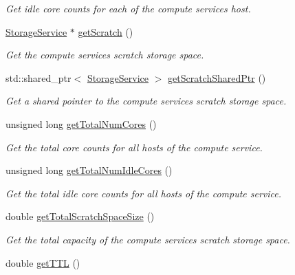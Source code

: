 \begin{DoxyCompactItemize}
\begin{DoxyCompactList}\small\item\em Get idle core counts for each of the compute service\textquotesingle{}s host. \end{DoxyCompactList}\item 
\hyperlink{classwrench_1_1_storage_service}{Storage\+Service} $\ast$ \hyperlink{classwrench_1_1_compute_service_a751da474fe424957a614116cef6a5e13}{get\+Scratch} ()
\begin{DoxyCompactList}\small\item\em Get the compute service\textquotesingle{}s scratch storage space. \end{DoxyCompactList}\item 
std\+::shared\+\_\+ptr$<$ \hyperlink{classwrench_1_1_storage_service}{Storage\+Service} $>$ \hyperlink{classwrench_1_1_compute_service_a6532846cd02094b6095341d37d5b2bf7}{get\+Scratch\+Shared\+Ptr} ()
\begin{DoxyCompactList}\small\item\em Get a shared pointer to the compute service\textquotesingle{}s scratch storage space. \end{DoxyCompactList}\item 
unsigned long \hyperlink{classwrench_1_1_compute_service_a5d2e4bca8b531521561f167769186f56}{get\+Total\+Num\+Cores} ()
\begin{DoxyCompactList}\small\item\em Get the total core counts for all hosts of the compute service. \end{DoxyCompactList}\item 
unsigned long \hyperlink{classwrench_1_1_compute_service_a225719efa4cb6c3b910c20e8828cb789}{get\+Total\+Num\+Idle\+Cores} ()
\begin{DoxyCompactList}\small\item\em Get the total idle core counts for all hosts of the compute service. \end{DoxyCompactList}\item 
double \hyperlink{classwrench_1_1_compute_service_ae0a8acd4a82063250799e313f1d520d1}{get\+Total\+Scratch\+Space\+Size} ()
\begin{DoxyCompactList}\small\item\em Get the total capacity of the compute service\textquotesingle{}s scratch storage space. \end{DoxyCompactList}\item 
double \hyperlink{classwrench_1_1_compute_service_a244e08a35ea94061acc1396f9447bb0c}{get\+T\+TL} ()

\end{DoxyCompactItemize}
